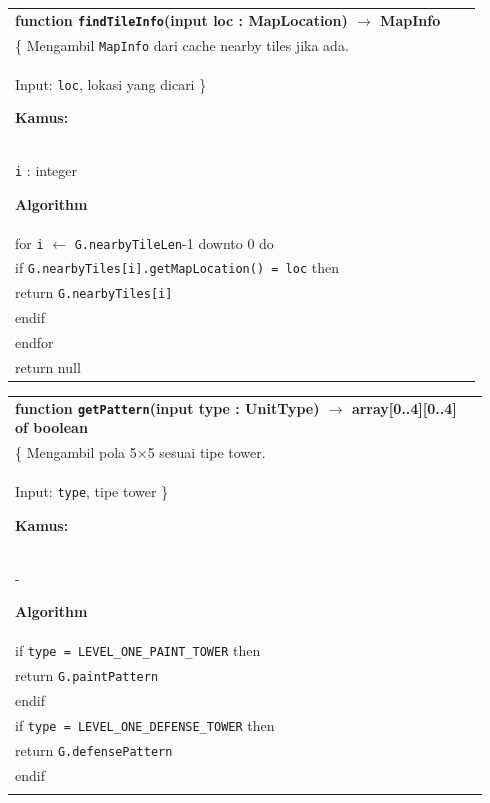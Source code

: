 \documentclass{article}
\newenvironment{pseudobox}
{
\centering
\begin{longtable}{|p{0.94\linewidth}|}
\hline
}
{
\\ \hline
\end{longtable}
\vspace{0.05cm}
}
\begin{document}
\begin{enumerate}[label=\alph*.]
\begin{enumerate}[label=\alph*.]
\begin{pseudobox}
\textbf{function \texttt{findTileInfo}(input loc : MapLocation) $\rightarrow$ MapInfo} \\
\{ Mengambil \texttt{MapInfo} dari cache nearby tiles jika ada. \\
Input: \texttt{loc}, lokasi yang dicari
\}

\textbf{Kamus:} \\
\hspace*{1.5em}\texttt{i} : integer

\textbf{Algorithm} \\
\hspace*{1.5em}for \texttt{i} $\leftarrow$ \texttt{G.nearbyTileLen}-1 downto 0 do \\
\hspace*{3em}if \texttt{G.nearbyTiles[i].getMapLocation() = loc} then \\
\hspace*{4.5em}return \texttt{G.nearbyTiles[i]} \\
\hspace*{3em}endif \\
\hspace*{1.5em}endfor \\
\hspace*{1.5em}return null
\end{pseudobox}

\begin{pseudobox}
\textbf{function \texttt{getPattern}(input type : UnitType) $\rightarrow$ array[0..4][0..4] of boolean} \\
\{ Mengambil pola 5$\times$5 sesuai tipe tower. \\
Input: \texttt{type}, tipe tower
\}

\textbf{Kamus:} \\
\hspace*{1.5em}-

\textbf{Algorithm} \\
\hspace*{1.5em}if \texttt{type = LEVEL\_ONE\_PAINT\_TOWER} then \\
\hspace*{3em}return \texttt{G.paintPattern} \\
\hspace*{1.5em}endif \\

\hspace*{1.5em}if \texttt{type = LEVEL\_ONE\_DEFENSE\_TOWER} then \\
\hspace*{3em}return \texttt{G.defensePattern} \\
\hspace*{1.5em}endif \\


\end{pseudobox}
\end{enumerate}
\end{enumerate}
\end{document}
